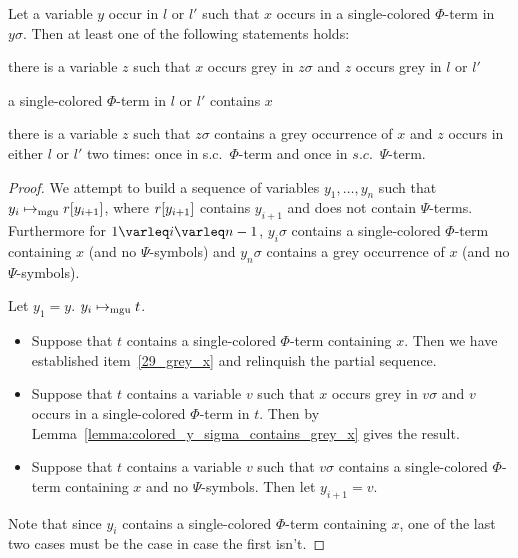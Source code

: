\documentclass[,%
	paper=a4,%
	DIV11, %
	twoside=false,%
	liststotoc,
	bibtotoc,
	draft=false,%
	numbers=noendperiod
]{scrartcl}
\begin{document}
\begin{lemma}
	\label{lemma:y_sigma_contains_colored_x}
	Let a variable $y$ occur in $l$ or $l'$ such that $x$ occurs in a single-colored $\Phi$-term in $y\sigma$.
	Then at least one of the following statements holds:
	\begin{compactenum}
	\item 
		there is a variable $z$ such that $x$ occurs grey in $z\sigma$ and $z$ occurs grey in $l$ or $l'$
	\item
		a single-colored $\Phi$-term in $l$ or $l'$ contains $x$
		\label{29_grey_x}
	\item
		there is a variable $z$ such that $z\sigma$ contains a grey occurrence of $x$ and $z$ occurs in either $l$ or $l'$ two times: once in s.c.\ $\Phi$-term and once in $s.c.$\ $\Psi$-term.
	\end{compactenum}
\end{lemma}
\begin{proof}


	We attempt to build a sequence of variables $y_1, \dots, y_n$ such that $y_i\mapsto_{\operatorname{mgu}} r[y_{i+1}]$, where $r[y_{i+1}]$ contains $y_{i+1}$ and does not contain $\Psi$-terms.
	Furthermore for $1\varleq i \varleq n-1$, $y_i\sigma$ contains a single-colored $\Phi$-term containing $x$ (and no $\Psi$-symbols) and $y_n\sigma$ contains a grey occurrence of $x$ (and no $\Psi$-symbols).

	Let $y_1 = y$.
	$y_i \mapsto_{\operatorname{mgu}} t$.
	\begin{itemize}
		\item
			Suppose that $t$ contains a single-colored $\Phi$-term containing $x$.
			Then we have established item~\ref{29_grey_x} and relinquish the partial sequence.

		\item
			Suppose that $t$ contains a variable $v$ such that $x$ occurs grey in $v\sigma$ and $v$ occurs in a single-colored $\Phi$-term in $t$. 
			Then by Lemma~\ref{lemma:colored_y_sigma_contains_grey_x} gives the result.

		\item
			Suppose that $t$ contains a variable $v$ such that $v\sigma$ contains a single-colored $\Phi$-term containing $x$ and no $\Psi$-symbols. Then let $y_{i+1} = v$.
	\end{itemize}
	Note that since $y_i$ contains a single-colored $\Phi$-term containing $x$, one of the last two cases must be the case in case the first isn't.

\end{proof}
\end{document}
